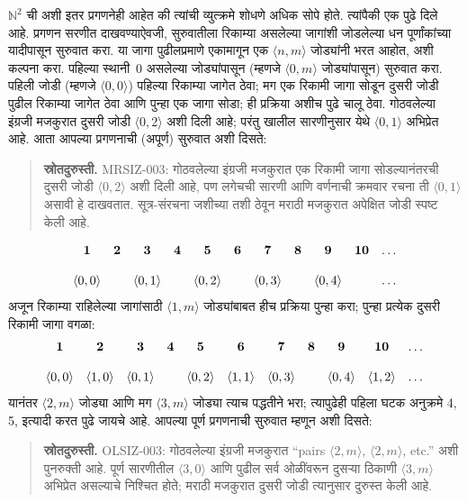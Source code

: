 \documentclass[11pt,a4paper,openany]{book}
\theoremstyle{definition}
\newenvironment{explain}{}{}
\newcommand{\tuple}[1]{\langle #1\rangle}
\newcommand{\Nat}{\mathbb{N}}
\begin{document}
\begin{explain}
$\Nat^2$ ची अशी इतर प्रगणनेही आहेत की त्यांची व्युत्क्रमे शोधणे अधिक
सोपे होते. त्यांपैकी एक पुढे दिले आहे. प्रगणन सरणीत दाखवण्याऐवजी,
सुरुवातीला रिकाम्या असलेल्या जागांशी जोडलेल्या धन पूर्णांकांच्या
यादीपासून सुरुवात करा. या जागा पुढीलप्रमाणे एकामागून एक
$\tuple{n,m}$ जोड्यांनी भरत आहोत, अशी कल्पना करा. पहिल्या स्थानी~$0$
असलेल्या जोड्यांपासून (म्हणजे $\tuple{0,m}$ जोड्यांपासून) सुरुवात करा.
पहिली जोडी (म्हणजे $\tuple{0,0}$) पहिल्या रिकाम्या जागेत ठेवा; मग एक
रिकामी जागा सोडून दुसरी जोडी पुढील रिकाम्या जागेत ठेवा आणि पुन्हा एक
जागा सोडा; ही प्रक्रिया अशीच पुढे चालू ठेवा. गोठवलेल्या इंग्रजी
मजकुरात दुसरी जोडी $\tuple{0,2}$ अशी दिली आहे; परंतु खालील सारणीनुसार
येथे $\langle 0,1\rangle$ अभिप्रेत आहे. आता आपल्या प्रगणनाची (अपूर्ण) सुरुवात अशी
दिसते:
\begin{quote}\small\textbf{स्रोतदुरुस्ती.} MRSIZ-003: गोठवलेल्या इंग्रजी मजकुरात एक रिकामी जागा सोडल्यानंतरची दुसरी जोडी $\langle 0,2\rangle$ अशी दिली आहे, पण लगेचची सारणी आणि वर्णनाची क्रमवार रचना ती $\langle 0,1\rangle$ असावी हे दाखवतात. सूत्र-संरचना जशीच्या तशी ठेवून मराठी मजकुरात अपेक्षित जोडी स्पष्ट केली आहे.\end{quote}
\[
\begin{array}{@{}c c c c c c c c c c c@{}}
\mathbf 1 & \mathbf 2 & \mathbf 3 & \mathbf 4 & \mathbf 5 & \mathbf 6 & \mathbf 7 & \mathbf 8 & \mathbf 9 & \mathbf{10} & \dots \\ \\
\tuple{0,0} &  & \tuple{0,1} &  & \tuple{0,2} &  & \tuple{0,3} & & \tuple{0,4} &  & \dots \\
\end{array}
\]
अजून रिकाम्या राहिलेल्या जागांसाठी $\tuple{1,m}$ जोड्यांबाबत हीच
प्रक्रिया पुन्हा करा; पुन्हा प्रत्येक दुसरी रिकामी जागा वगळा:
\[
\begin{array}{@{}c c c c c c c c c c c@{}}
\mathbf 1 & \mathbf 2 & \mathbf 3 & \mathbf 4 & \mathbf 5 & \mathbf 6 & \mathbf 7 & \mathbf 8 & \mathbf 9 & \mathbf{10} & \dots \\ \\
\tuple{0,0} & \tuple{1,0} & \tuple{0,1} &  & \tuple{0,2} & \tuple{1,1} &
\tuple{0,3} & & \tuple{0,4} &  \tuple{1,2} & \dots \\
\end{array}
\]
यानंतर $\tuple{2,m}$ जोड्या आणि मग $\tuple{3,m}$ जोड्या त्याच पद्धतीने
भरा; त्यापुढेही पहिला घटक अनुक्रमे 4, 5, इत्यादी करत पुढे जायचे आहे.
आपल्या पूर्ण प्रगणनाची सुरुवात म्हणून अशी दिसते:
\begin{quote}\small\textbf{स्रोतदुरुस्ती.} OLSIZ-003: गोठवलेल्या इंग्रजी मजकुरात “pairs $\langle 2,m\rangle$, $\langle 2,m\rangle$, etc.” अशी पुनरुक्ती आहे. पूर्ण सारणीतील $\langle 3,0\rangle$ आणि पुढील सर्व ओळींवरून दुसऱ्या ठिकाणी $\langle 3,m\rangle$ अभिप्रेत असल्याचे निश्चित होते; मराठी मजकुरात दुसरी जोडी त्यानुसार दुरुस्त केली आहे.\end{quote}

\end{explain}
\end{document}
